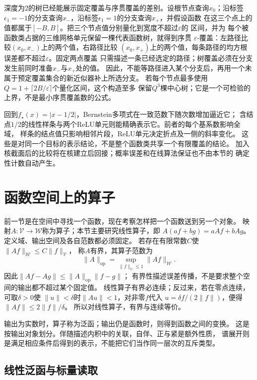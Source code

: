 深度为$2$的树已经能展示固定覆盖与序贯覆盖的差别。设根节点查询$x_0$；沿标签
$\epsilon_1=-1$的分支查询$x_-$，沿标签$\epsilon_1=1$的分支查询$x_+$，并假设函数
在这三个点上的值都属于$[-B,B]$。把三个节点值分别量化到宽度不超过$\varepsilon$的
区间，并为
每个被函数类占据的三维网格单元保留一棵代表函数树，就得到序贯
$\varepsilon$-覆盖：左路径比较$(x_0,x_-)$上的两个值，右路径比较
$(x_0,x_+)$上的两个值，每条路径的均方根误差都不超过$\varepsilon$。固定两点覆盖
只需描述一条已经选定的路径；树覆盖必须在分支发生前同时准备$x_-$与$x_+$处的值。
因此，不能等路径进入某个分支后，再用一个未属于预定覆盖集合的新近似器补上所选分支。
若每个节点最多使用$Q=1+\lceil2B/\varepsilon\rceil$个量化区间，这个构造至多
保留$Q^3$棵中心树；它是一个可检验的上界，不是最小序贯覆盖数的公式。

回到$f_\star(x)=|x-1/2|$，Bernstein多项式在一致范数下随次数增加逼近它；
含结点$1/2$的线性样条与两个ReLU单元则能精确表示它。前者的每个基系数影响全域，
样条的结点值只影响相邻片段，ReLU单元决定折点及一侧的斜率变化。
这些是对同一个目标的表示结论，不是整个函数类共享一个有限覆盖的结论。
加入核截面后的比较将在核建立后回接；概率误差和在线算法保证也不由本节的
确定性计数自动产生。

\section{函数空间上的算子}
\label{sec:functional-operators}

前一节是在空间中寻找一个函数，现在考察怎样把一个函数送到另一个对象。
映射$A:\mathcal V\to\mathcal W$称为算子；本节主要研究线性算子，即
$A(af+bg)=aAf+bAg$。定义域、输出空间及各自范数都必须固定。
若存在有限常数$C$使$\lVert Af\rVert_{\mathcal W}\leq C\lVert f\rVert_{\mathcal V}$，
称$A$有界，其算子范数为
\[
 \lVert A\rVert_{\mathrm{op}}
 =\sup_{\lVert f\rVert_{\mathcal V}\leq1}\lVert Af\rVert_{\mathcal W}.
\]
因此$\lVert Af-Ag\rVert\leq\lVert A\rVert_{\mathrm{op}}\lVert f-g\rVert$；
有界性描述误差传播，不是要求整个空间的输出都不超过某个固定值。
线性算子有界必连续；反过来，若在零点连续，可取$\delta>0$使
$\lVert u\rVert<\delta$时$\lVert Au\rVert<1$，对非零$f$代入
$u=\delta f/(2\lVert f\rVert)$，便得$\lVert Af\rVert\leq2\lVert f\rVert/\delta$。
所以对线性算子，有界与连续等价。

输出为实数时，算子称为泛函；输出仍是函数时，则得到函数之间的变换。
这是按输出对象划分。伴随描述内积中的关联，自伴、正与紧是额外性质，
谱展开则是满足相应条件后得到的表示，不能把它们当作同一层次的互斥类型。

\subsection{线性泛函与标量读取}

